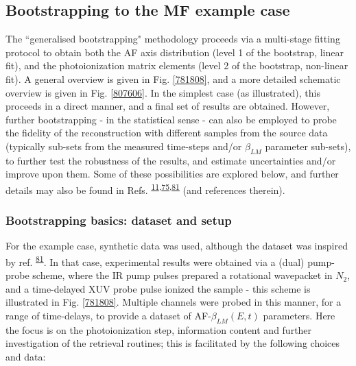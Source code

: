 \documentclass[10pt]{article}
\begin{document}
\subsection{Bootstrapping to the MF example case\label{sec:bootstrapping}}


The ``generalised bootstrapping" methodology proceeds via a multi-stage fitting protocol to obtain both the AF axis distribution (level 1 of the bootstrap, linear fit), and the photoionization matrix elements (level 2 of the bootstrap, non-linear fit). A general overview is given in Fig. \ref{781808}, and a more detailed schematic overview is given in Fig. \ref{807606}. In the simplest case (as illustrated), this proceeds in a direct manner, and a final set of results are obtained. However, further bootstrapping - in the statistical sense - can also be employed to probe the fidelity of the reconstruction with different samples from the source data (typically sub-sets from the measured time-steps and/or $\beta_{LM}$ parameter sub-sets), to further test the robustness of the results, and estimate uncertainties and/or improve upon them. Some of these possibilities are explored below, and further details may also be found in Refs. \textsuperscript{\hyperref[csl:11]{11},\hyperref[csl:75]{75},\hyperref[csl:81]{81}} (and references therein).






\subsubsection{Bootstrapping basics: dataset and setup}

For the example case, synthetic data was used, although the dataset was inspired by ref. \textsuperscript{\hyperref[csl:81]{81}}. In that case, experimental results were obtained via a (dual) pump-probe scheme, where the IR pump pulses prepared a rotational wavepacket in $N_2$, and a time-delayed XUV probe pulse ionized the sample - this scheme is illustrated in Fig. \ref{781808}. Multiple channels were probed in this manner, for a range of time-delays, to provide a dataset of AF-$\beta_{LM}(E,t)$ parameters. Here the focus is on the photoionization step, information content and further investigation of the retrieval routines; this is facilitated by the following choices and data:
\end{document}
